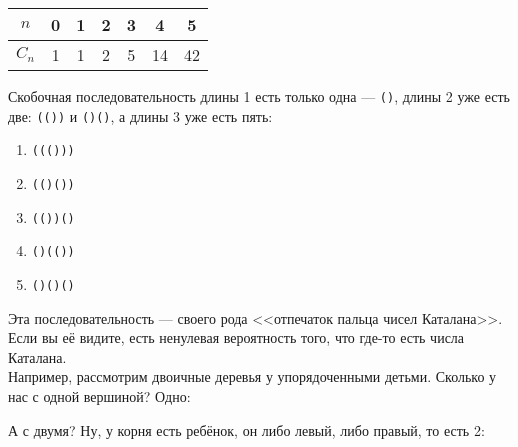 \documentclass{article}
\begin{document}
\begin{itemize}
\begin{Comment}
            \begin{center}
                \begin{tabular}{|c|c|c|c|c|c|c|}
                    \hline
                    $n$ & 0 & 1 & 2 & 3 & 4 & 5\\
                    \hline
                    $C_n$ & 1 & 1 & 2 & 5 & 14 & 42\\
                    \hline
                \end{tabular}
            \end{center}
        \end{Comment}
        \begin{Example}
            Скобочная последовательность длины 1 есть только одна --- \texttt{()}, длины 2 уже есть две: \texttt{(())} и \texttt{()()}, а длины 3 уже есть пять:
            \begin{enumerate}
                \item \texttt{((()))}
                \item \texttt{(()())}
                \item \texttt{(())()}
                \item \texttt{()(())}
                \item \texttt{()()()}
            \end{enumerate}
        \end{Example}
        \begin{Comment}
            Эта последовательность --- своего рода <<отпечаток пальца чисел Каталана>>. Если вы её видите, есть ненулевая вероятность того, что где-то есть числа Каталана.\\
            Например, рассмотрим двоичные деревья у упорядоченными детьми. Сколько у нас с одной вершиной? Одно:
            \begin{center}
            \end{center}
            А с двумя? Ну, у корня есть ребёнок, он либо левый, либо правый, то есть 2:
            \begin{center}
\end{center}
\end{Comment}
\end{itemize}
\end{document}
